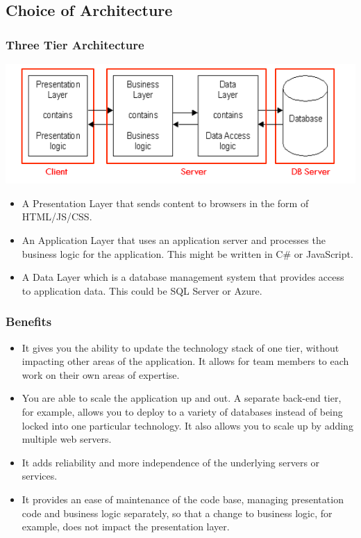 \documentclass{article}
\begin{document}
\subsection{Choice of Architecture}
\subsubsection{Three Tier Architecture}
\includegraphics[scale=1]{Capture2.png} 
\begin{itemize}
\item A Presentation Layer that sends content to browsers in the form of HTML/JS/CSS. 
\item An Application Layer that uses an application server and processes the business logic for the application. This might be written in C\# or JavaScript.
\item A Data Layer which is a database management system that provides access to application data. This could be SQL Server or Azure. \\
\end{itemize}
\subsubsection{Benefits}
\begin{itemize}
\item It gives you the ability to update the technology stack of one tier, without impacting other areas of the application.
It allows for team members to each work on their own areas of expertise.
\item You are able to scale the application up and out. A separate back-end tier, for example, allows you to deploy to a variety of databases instead of being locked into one particular technology. It also allows you to scale up by adding multiple web servers.
\item It adds reliability and more independence of the underlying servers or services.
\item It provides an ease of maintenance of the code base, managing presentation code and business logic separately, so that a change to business logic, for example, does not impact the presentation layer. \cite{tier}
\end{itemize}
\end{document}
